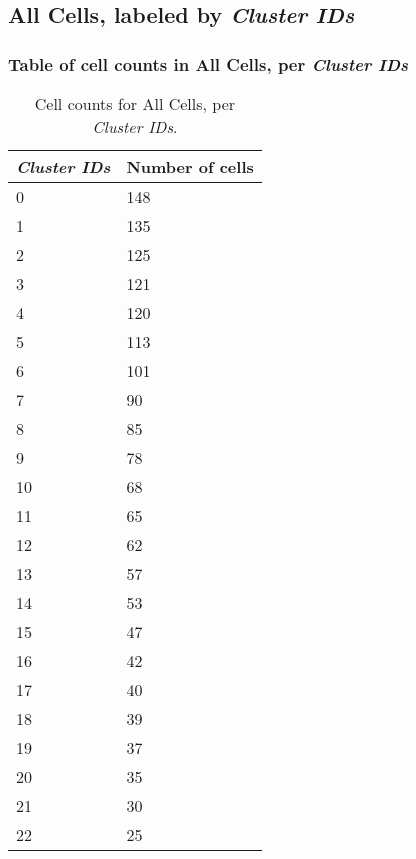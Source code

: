 \clearpage

\subsection{All Cells, labeled by \emph{Cluster IDs}}
\subsubsection{Table of cell counts in All Cells, per \emph{Cluster IDs}}\begin{table}[h]
\centering
\label{my-label}
\begin{tabular}{@{}ll@{}}
\toprule

\emph{Cluster IDs}& Number of cells \\ \midrule
0 & 148 \\

1 & 135 \\

2 & 125 \\

3 & 121 \\

4 & 120 \\

5 & 113 \\

6 & 101 \\

7 & 90 \\

8 & 85 \\

9 & 78 \\

10 & 68 \\

11 & 65 \\

12 & 62 \\

13 & 57 \\

14 & 53 \\

15 & 47 \\

16 & 42 \\

17 & 40 \\

18 & 39 \\

19 & 37 \\

20 & 35 \\

21 & 30 \\

22 & 25 \\
\bottomrule
\end{tabular}
\caption{Cell counts for All Cells, per \emph{Cluster IDs}.}
\end{table}

